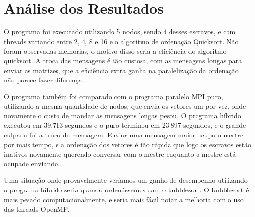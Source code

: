 \section{Análise dos Resultados}

O programa foi executado utilizando 5 nodos, sendo 4 desses escravos, e com threads variando entre 2, 4, 8 e 16 e o algoritmo de ordenação Quicksort. Não foram observadas melhorias, o motivo disso seria a eficiência do algoritmo quicksort. A troca das mensagens é tão custosa, com as mensagens longas para enviar as matrizes, que a eficiência extra ganha na paralelização da ordenação não parece fazer diferença.

O programa também foi comparado com o programa paralelo MPI puro, utilizando a mesma quantidade de nodos, que envia os vetores um por vez, onde novamente o custo de mandar as mensagens longas pesou. O programa híbrido executou em 39.713 segundos e o puro terminou em 23.897 segundos, e o grande culpado foi a troca de mensagem. Enviar uma mensagem maior ocupa o mestre por mais tempo, e a ordenação dos vetores é tão rápida que logo os escravos estão inativos novamente querendo conversar com o mestre enquanto o mestre está ocupado enviando.

Uma situação onde provavelmente veríamos um ganho de desempenho utilizando o programa híbrido seria quando ordenássemos com o bubblesort. O bubblesort é mais pesado computacionalmente, e seria mais fácil notar a melhoria com o uso das threads OpenMP.